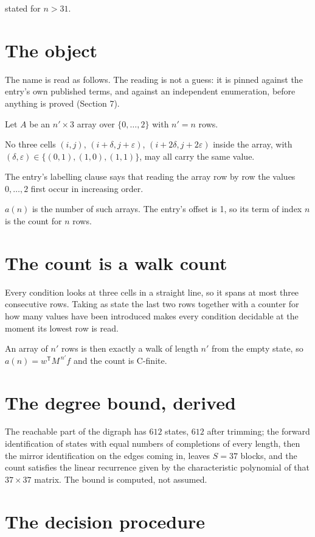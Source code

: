 \documentclass[11pt]{article}
\theoremstyle{definition}
\begin{document}
stated for $n > 31$.

\section{The object}

The name is read as follows. The reading is not a guess: it is pinned against the entry's own published terms, and against an independent enumeration, before anything is proved (Section 7).

Let $A$ be an $n' \times 3$ array over $\{0,\dots,2\}$ with $n' = n$ rows.

No three cells $(i,j)$, $(i{+}\delta,j{+}\varepsilon)$, $(i{+}2\delta,j{+}2\varepsilon)$ inside the array, with $(\delta,\varepsilon) \in \{(0,1), (1,0), (1,1)\}$, may all carry the same value.

The entry's labelling clause says that reading the array row by row the values $0,\dots,2$ first occur in increasing order.

$a(n)$ is the number of such arrays. The entry's offset is 1, so its term of index $n$ is the count for $n$ rows.

\section{The count is a walk count}

Every condition looks at three cells in a straight line, so it spans at most three consecutive rows. Taking as state the last two rows together with a counter for how many values have been introduced makes every condition decidable at the moment its lowest row is read.

An array of $n'$ rows is then exactly a walk of length $n'$ from the empty state, so $a(n) = w^{\mathsf T}M^{\,n'}f$ and the count is C-finite.

\section{The degree bound, derived}

The reachable part of the digraph has $612$ states, $612$ after trimming; the forward identification of states with equal numbers of completions of every length, then the mirror identification on the edges coming in, leaves $S = 37$ blocks, and the count satisfies the linear recurrence given by the characteristic polynomial of that $37\times37$ matrix. The bound is computed, not assumed.

\section{The decision procedure}
\end{document}
